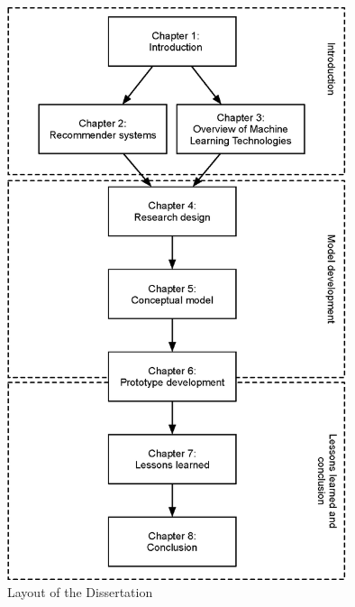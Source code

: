 \begin{figure}[htbp]
\centering
\includegraphics[width=10cm]{./figures/overlast222.eps}
\caption{Layout of the Dissertation}
\label{fig:Dlayout}
\end{figure}
